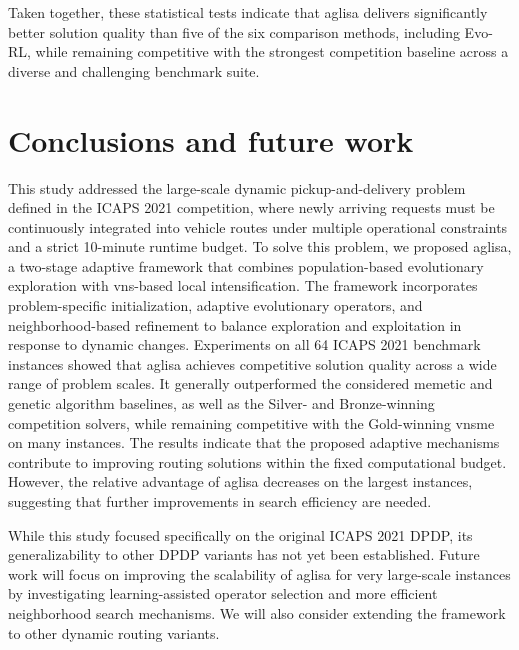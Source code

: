 \documentclass[pdflatex]{sn-jnl}
\begin{document}
Taken together, these statistical tests indicate that \gls{aglisa} delivers
significantly better solution quality than five of the six comparison methods,
including Evo-RL, while remaining competitive with the strongest competition
baseline across a diverse and challenging benchmark suite.


\section{Conclusions and future work} \label{sec:con}
This study addressed the large-scale dynamic pickup-and-delivery problem defined in the ICAPS 2021 competition, where newly arriving requests must be continuously integrated into vehicle routes under multiple operational 
constraints and a strict 10-minute runtime budget. To solve this problem, we proposed \gls{aglisa}, a two-stage adaptive framework that combines population-based evolutionary exploration with \gls{vns}-based local intensification. The framework incorporates problem-specific initialization, 
adaptive evolutionary operators, and neighborhood-based refinement to balance exploration and exploitation in response to dynamic changes. Experiments on all 64 ICAPS 2021 benchmark instances showed that \gls{aglisa} achieves competitive solution quality across a wide range of 
problem scales. It generally outperformed the considered memetic and genetic algorithm baselines, as well as the Silver- and Bronze-winning competition solvers, while remaining competitive with the Gold-winning \gls{vnsme} on 
many instances. The results indicate that the proposed adaptive mechanisms contribute to improving routing solutions within the fixed computational budget. However, the relative advantage of \gls{aglisa} decreases on the 
largest instances, suggesting that further improvements in search efficiency are needed.

While this study focused specifically on the original ICAPS 2021 DPDP, its generalizability to other DPDP variants has not yet been established. Future work will focus on improving the scalability of \gls{aglisa} for very 
large-scale instances by investigating learning-assisted operator selection and more efficient neighborhood search mechanisms. We will also consider extending the framework to other dynamic routing variants.
\end{document}

